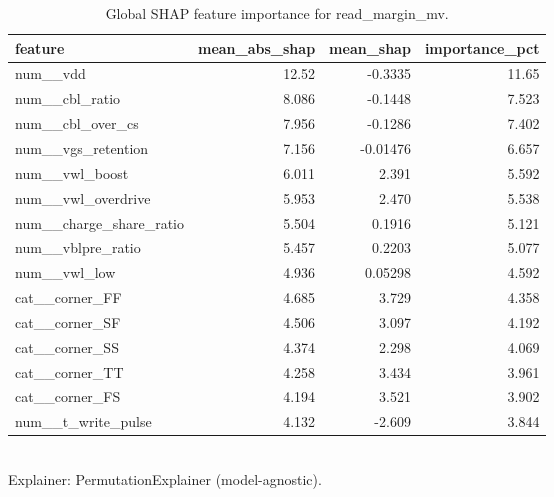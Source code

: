 \begin{table}[!t]
\centering
\caption{Global SHAP feature importance for read_margin_mv.}
\label{tab:xai_shap_importance_read_margin_mv}
\footnotesize
\begin{tabular}{lrrr}
\toprule
feature & mean\_abs\_shap & mean\_shap & importance\_pct \\
\midrule
num\_\_vdd & 12.52 & -0.3335 & 11.65 \\
num\_\_cbl\_ratio & 8.086 & -0.1448 & 7.523 \\
num\_\_cbl\_over\_cs & 7.956 & -0.1286 & 7.402 \\
num\_\_vgs\_retention & 7.156 & -0.01476 & 6.657 \\
num\_\_vwl\_boost & 6.011 & 2.391 & 5.592 \\
num\_\_vwl\_overdrive & 5.953 & 2.470 & 5.538 \\
num\_\_charge\_share\_ratio & 5.504 & 0.1916 & 5.121 \\
num\_\_vblpre\_ratio & 5.457 & 0.2203 & 5.077 \\
num\_\_vwl\_low & 4.936 & 0.05298 & 4.592 \\
cat\_\_corner\_FF & 4.685 & 3.729 & 4.358 \\
cat\_\_corner\_SF & 4.506 & 3.097 & 4.192 \\
cat\_\_corner\_SS & 4.374 & 2.298 & 4.069 \\
cat\_\_corner\_TT & 4.258 & 3.434 & 3.961 \\
cat\_\_corner\_FS & 4.194 & 3.521 & 3.902 \\
num\_\_t\_write\_pulse & 4.132 & -2.609 & 3.844 \\
\bottomrule
\end{tabular}
\\[2pt] \footnotesize Explainer: PermutationExplainer (model-agnostic).
\end{table}
